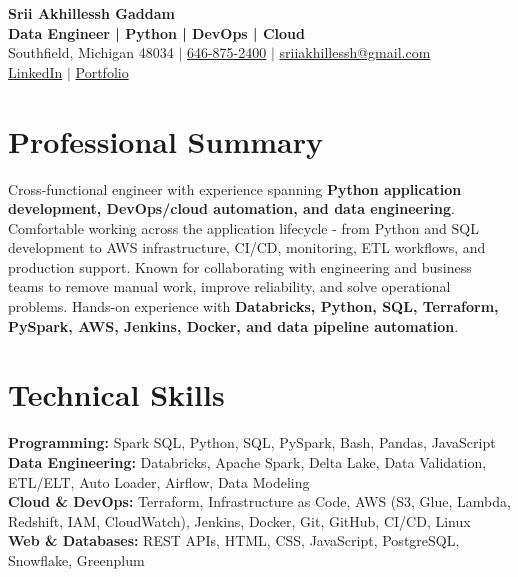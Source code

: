 \documentclass[letterpaper,10pt]{article}
\begin{document}
\fontsize{9.35pt}{10.45pt}\selectfont

\begin{center}
    {\LARGE \textbf{Srii Akhillessh Gaddam}} \\[-1pt]
    \textbf{Data Engineer | Python | DevOps | Cloud} \\[2pt]
    Southfield, Michigan 48034 $|$
    \href{tel:6468752400}{646-875-2400} $|$
    \href{mailto:sriiakhillessh@gmail.com}{sriiakhillessh@gmail.com} \\[1pt]
    \href{https://www.linkedin.com/in/srii-akhiilessh-gaddam-b48668191/}{LinkedIn} $|$
    \href{https://sriiakhillesshg.github.io/portfolio/}{Portfolio}
\end{center}
\vspace{-8pt}

\section{Professional Summary}
\small{Cross-functional engineer with experience spanning \textbf{Python application development, DevOps/cloud automation, and data engineering}. Comfortable working across the application lifecycle - from Python and SQL development to AWS infrastructure, CI/CD, monitoring, ETL workflows, and production support. Known for collaborating with engineering and business teams to remove manual work, improve reliability, and solve operational problems. Hands-on experience with \textbf{Databricks, Python, SQL, Terraform, PySpark, AWS, Jenkins, Docker, and data pipeline automation}.}

\section{Technical Skills}
\small{
\textbf{Programming:} Spark SQL, Python, SQL, PySpark, Bash, Pandas, JavaScript \\
\textbf{Data Engineering:} Databricks, Apache Spark, Delta Lake, Data Validation, ETL/ELT, Auto Loader, Airflow, Data Modeling \\
\textbf{Cloud \& DevOps:} Terraform, Infrastructure as Code, AWS (S3, Glue, Lambda, Redshift, IAM, CloudWatch), Jenkins, Docker, Git, GitHub, CI/CD, Linux \\
\textbf{Web \& Databases:} REST APIs, HTML, CSS, JavaScript, PostgreSQL, Snowflake, Greenplum
}
\end{document}
